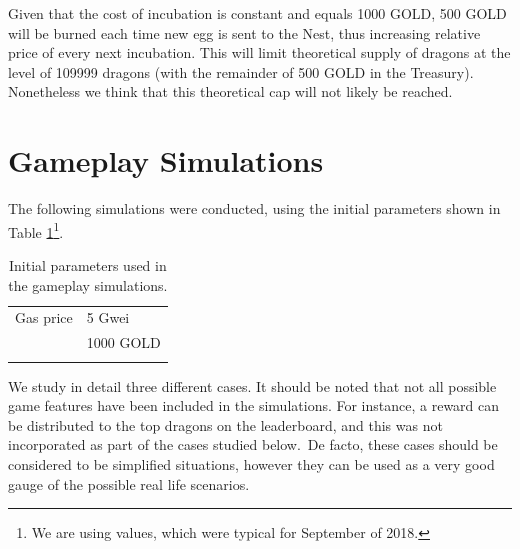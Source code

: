 \documentclass[12pt]{article}
\begin{document}
{Given that the cost of incubation is constant and equals 1000 GOLD, 500 GOLD will be burned each time new egg is sent to the Nest, thus increasing relative price of every next incubation. This will limit theoretical supply of dragons at the level of 109999 dragons (with the remainder of 500 GOLD in the Treasury). Nonetheless we think that this theoretical cap will not likely be reached.\par

\newpage
\par

\section{Gameplay Simulations}
\label{Gameplay Simulations}  \par

The following simulations were conducted, using the initial parameters shown in Table \ref{tab:Initial parameters used in the gameplay simulations.}\footnote{We are using values, which were typical for September of 2018.}.




\begin{table}[H]
 			\centering
\begin{tabular}{p{2.94in}p{2.94in}}
\hline
\multicolumn{1}{|p{2.94in}}{Gas price} & 
\multicolumn{1}{|p{2.94in}|}{5 Gwei} \\
\hhline{--}
\multicolumn{1}{|p{2.94in}}{Egg incubation cost} & 
\multicolumn{1}{|p{2.94in}|}{1000 GOLD} \\
\hhline{--}

\end{tabular}\caption{Initial parameters used in the gameplay simulations.}
\label{tab:Initial parameters used in the gameplay simulations.}

 \end{table}




We study in detail three different cases. It should be noted that not all possible game features have been included in the simulations. For instance, a reward can be distributed to the top dragons on the leaderboard, and this was not incorporated as part of the cases studied below.\ De facto, these cases should be considered to be simplified situations,  however they can be used as a very good gauge of the possible real life scenarios.\par

}
\end{document}

